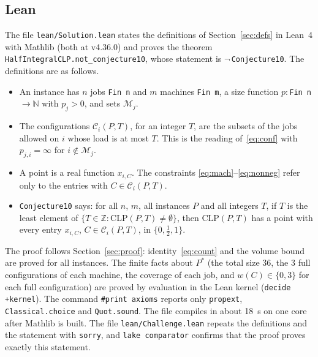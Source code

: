 \documentclass[11pt]{article}
\theoremstyle{remark}
\newcommand{\cC}{\mathcal{C}}
\newcommand{\cM}{\mathcal{M}}
\newcommand{\CLP}{\mathrm{CLP}}
\begin{document}
\subsection{Lean}\label{sec:lean}
The file \texttt{lean/Solution.lean} states the definitions of
Section~\ref{sec:defs} in Lean~4 with Mathlib (both at v4.36.0) and
proves the theorem \texttt{HalfIntegralCLP.not\_conjecture10}, whose statement is $\neg$\,\texttt{Conjecture10}.
The definitions are as follows.
\begin{itemize}
\item An instance has $n$ jobs \texttt{Fin n} and $m$ machines
\texttt{Fin m}, a size function $p\colon$\texttt{Fin n}$\to\mathbb{N}$
with $p_j>0$, and sets $\cM_j$.
\item The configurations $\cC_i(P,T)$, for an integer $T$, are the subsets
of the jobs allowed on $i$ whose load is at most $T$. This is the
reading of~\eqref{eq:conf} with $p_{j,i}=\infty$ for $i\notin\cM_j$.
\item A point is a real function $x_{i,C}$. The constraints
\eqref{eq:mach}--\eqref{eq:nonneg} refer only to the entries with
$C\in\cC_i(P,T)$.
\item \texttt{Conjecture10} says: for all $n$, $m$, all instances $P$
and all integers $T$, if $T$ is the least element of
$\{T\in\mathbb{Z}:\CLP(P,T)\neq\emptyset\}$, then $\CLP(P,T)$ has a
point with every entry $x_{i,C}$, $C\in\cC_i(P,T)$, in
$\{0,\frac12,1\}$.
\end{itemize}
The proof follows Section~\ref{sec:proof}: identity~\eqref{eq:count} and
the volume bound are proved for all instances. The finite facts about
$P^\ast$ (the total size 36, the 3 full configurations of each machine,
the coverage of each job, and $w(C)\in\{0,3\}$ for each full
configuration) are proved by evaluation in the Lean kernel
(\texttt{decide +kernel}). The command \texttt{\#print axioms} reports
only \texttt{propext}, \texttt{Classical.choice} and \texttt{Quot.sound}.
The file compiles in about 18~s on one core after Mathlib is built.
The file \texttt{lean/Challenge.lean} repeats the definitions and the
statement with \texttt{sorry}, and \texttt{lake comparator} confirms that
the proof proves exactly this statement.
\end{document}
